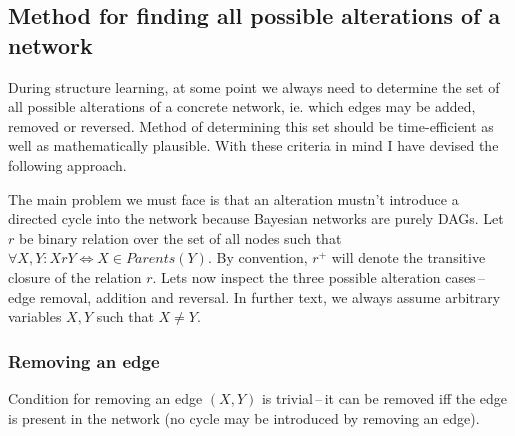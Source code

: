 \documentclass[english,cover]{fitthesis} %
\begin{document}

\subsection{Method for finding all possible alterations of a network}
During structure learning, at some point we always need to determine the set of all possible alterations of a concrete network, ie. which edges may be added, removed or reversed. Method of determining this set should be time-efficient as well as mathematically plausible. With these criteria in mind I have devised the following approach.

The main problem we must face is that an alteration mustn't introduce a directed cycle into the network because Bayesian networks are purely DAGs. Let $r$ be binary relation over the set of all nodes such that $\forall X,Y: XrY \Leftrightarrow X \in Parents(Y)$. By convention, $r^+$ will denote the transitive closure of the relation $r$. Lets now inspect the three possible alteration cases\,--\,edge removal, addition and reversal. In further text, we always assume arbitrary variables $X,Y$ such that $X \neq Y$.


\subsubsection{Removing an edge}
Condition for removing an edge $(X,Y)$ is trivial\,--\,it can be removed iff the edge is present in the network (no cycle may be introduced by removing an edge).
\end{document}
